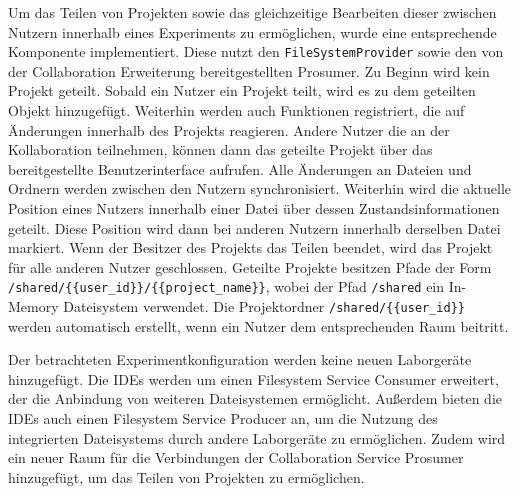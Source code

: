 Um das Teilen von Projekten sowie das gleichzeitige Bearbeiten dieser zwischen Nutzern innerhalb eines Experiments zu ermöglichen, wurde eine entsprechende Komponente implementiert. Diese nutzt den \texttt{FileSystemProvider} sowie den von der Collaboration Erweiterung bereitgestellten Prosumer. Zu Beginn wird kein Projekt geteilt. Sobald ein Nutzer ein Projekt teilt, wird es zu dem geteilten Objekt hinzugefügt. Weiterhin werden auch Funktionen registriert, die auf Änderungen innerhalb des Projekts reagieren. Andere Nutzer die an der Kollaboration teilnehmen, können dann das geteilte Projekt über das bereitgestellte Benutzerinterface aufrufen. Alle Änderungen an Dateien und Ordnern werden zwischen den Nutzern synchronisiert. Weiterhin wird die aktuelle Position eines Nutzers innerhalb einer Datei über dessen Zustandsinformationen geteilt. Diese Position wird dann bei anderen Nutzern innerhalb derselben Datei markiert. Wenn der Besitzer des Projekts das Teilen beendet, wird das Projekt für alle anderen Nutzer geschlossen. Geteilte Projekte besitzen Pfade der Form \texttt{/shared/\{\{user\_id\}\}/\{\{project\_name\}\}}, wobei der Pfad \texttt{/shared} ein In-Memory Dateisystem verwendet. Die Projektordner \texttt{/shared/\{\{user\_id\}\}} werden automatisch erstellt, wenn ein Nutzer dem entsprechenden Raum beitritt.

Der betrachteten Experimentkonfiguration werden keine neuen Laborgeräte hinzugefügt. Die IDEs werden um einen Filesystem Service Consumer erweitert, der die Anbindung von weiteren Dateisystemen ermöglicht. Außerdem bieten die IDEs auch einen Filesystem Service Producer an, um die Nutzung des integrierten Dateisystems durch andere Laborgeräte zu ermöglichen. Zudem wird ein neuer Raum für die Verbindungen der Collaboration Service Prosumer hinzugefügt, um das Teilen von Projekten zu ermöglichen.